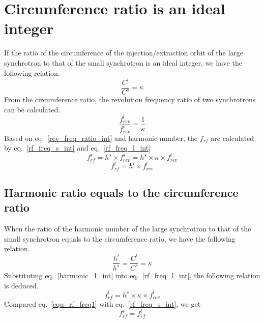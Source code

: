 \section{ Circumference ratio is an ideal integer}

If the ratio of the circumference of the injection/extraction orbit of the large synchrotron to that of the small synchrotron is an ideal integer, we have the following relation. 
\begin{equation}
\frac{C^l}{C^s}=\kappa \label{circumference_ratio_int}
\end{equation}
From the circumference ratio, the revolution frequency ratio of two synchrotrons can be calculated.
\begin{equation}
\frac{f_{rev}^{l}}{f_{rev}^{s}}=\frac{1}{\kappa} \label{rev_freq_ratio_int}
\end{equation}
Based on eq.~\ref{rev_freq_ratio_int} and harmonic number, the $f_{rf}$ are calculated by eq.~\ref{rf_freq_s_int} and eq.~\ref{rf_freq_l_int}
\begin{equation} 
f_{rf}^{s}= h^s \times f_{rev}^{s}=h^s \times \kappa \times f_{rev}^{l} \label{rf_freq_s_int}
\end{equation}
\begin{equation} 
f_{rf}^{l}= h^l \times f_{rev}^{l} \label{rf_freq_l_int}
\end{equation}

\subsection{Harmonic ratio equals to the circumference ratio}
\label{sec:cir_no_int}
When the ratio of the harmonic number of the large synchrotron to that of the small synchrotron equals to the circumference ratio, we have the following relation.
\begin{equation}
\frac {h^{l}}{h^{s}}=\frac {C^{l}}{C^{s}}= \kappa  \label{harmonic_1_int}
\end{equation}
Substituting eq.~\ref{harmonic_1_int} into eq.~\ref{rf_freq_l_int}, the following relation is deduced. 
\begin{equation}
f_{rf}^{l}= h^s \times \kappa \times f_{rev}^{l} \label{equ_rf_freq1}
\end{equation}
Compared eq.~\ref{equ_rf_freq1} with eq.~\ref{rf_freq_s_int}, we get
\begin{equation}
f_{rf}^{s}= f_{rf}^{l}\label{equ_rf_freq}
\end{equation}

